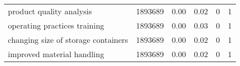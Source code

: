 \begin{table}[H]
{\begin{tabular}{lrrrrr}
            product quality analysis                          & 1893689 & 0.00     & 0.02      & 0   & 1        \\
            operating practices training                      & 1893689 & 0.00     & 0.03      & 0   & 1        \\
            changing size of storage containers               & 1893689 & 0.00     & 0.02      & 0   & 1        \\
            improved material handling                        & 1893689 & 0.00     & 0.02      & 0   & 1        \\ \bottomrule
        \end{tabular}
    }
\end{table}